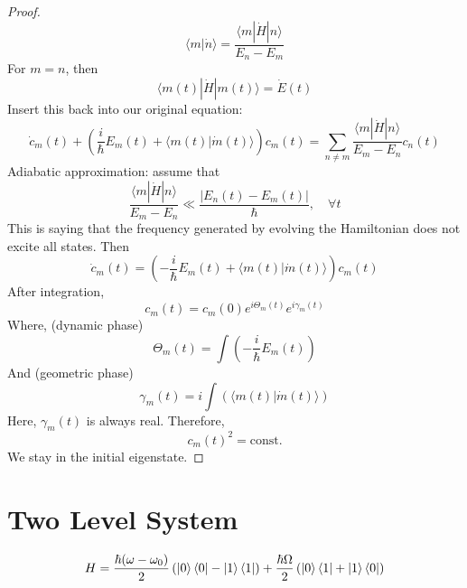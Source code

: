 \documentclass{article}
\newtheorem{one minute paper}[theorem]{One Minute Paper}
\begin{document}
\begin{proof}
    \begin{equation}
        \langle m | \dot{n} \rangle = \frac{\langle m | \dot{H} | n \rangle}{E_n - E_m}
    \end{equation}
    For $m = n$, then 
    \begin{equation}
        \langle m(t) | \dot{H} | m(t) \rangle = \dot{E}(t)
    \end{equation}
    Insert this back into our original equation: 
    \begin{equation}
        \dot{c}_m(t) + \left( \frac{i}{\hbar}E_m(t) + \langle m(t) | \dot{m}(t) \rangle \right)c_m(t) = \sum_{n \neq m} \frac{\langle m | \dot{H} | n \rangle}{E_m - E_n}c_n(t)
    \end{equation}
    Adiabatic approximation: assume that 
    \begin{equation}
        \frac{\langle m | \dot{H} | n \rangle}{E_m - E_n} \ll \frac{|E_n(t) - E_m(t)|}{\hbar}, \quad \forall t
    \end{equation}
    This is saying that the frequency generated by evolving the Hamiltonian does not excite all states. Then 
    \begin{equation}
        \dot{c}_m(t) = \left( -\frac{i}{\hbar}E_m(t) + \langle m(t)| \dot{m}(t) \rangle \right)c_m(t)
    \end{equation} 
    After integration, 
    \begin{equation}
        c_m(t) = c_m(0)e^{i\Theta_m(t)}e^{i\gamma_m (t)}
    \end{equation}
    Where, (dynamic phase)
    \begin{equation}
        \Theta_m(t) = \int\left( -\frac{i}{\hbar}E_m(t)\right)
    \end{equation}
    And (geometric phase)
    \begin{equation}
        \gamma_m(t) = i\int\left( \langle m(t)| \dot{m}(t) \rangle \right)
    \end{equation}
    Here, $\gamma_m(t)$ is always real. Therefore, 
    \begin{equation}
        c_m(t)^2 = \text{const.}
    \end{equation}
    We stay in the initial eigenstate. 
\end{proof}

\section*{Two Level System}  

\begin{equation}
    H = \frac{\hbar(\omega - \omega_0)}{2}\left( \ket{0}\bra{0} - \ket{1}\bra{1} \right) + \frac{\hbar \Omega}{2}\left( \ket{0}\bra{1} + \ket{1}\bra{0} \right)
\end{equation}
\end{document}
